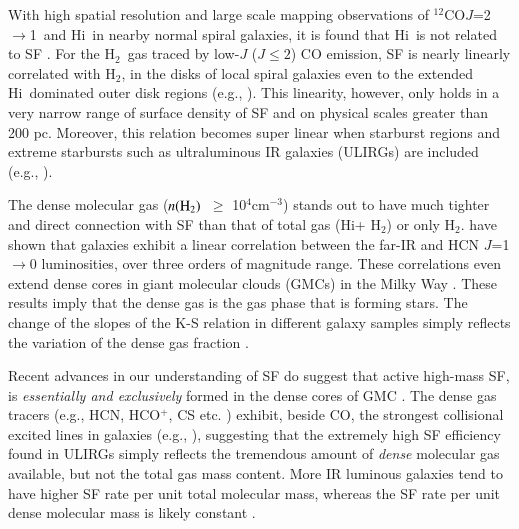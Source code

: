 \documentclass[legal,11pt]{article}
\def\cmt   {cm$^{-3}$\,}
\def\,{\thinspace}
\def\HI{H{\sc i}}
\def\Htwo{H$_2$}
\def\nHtwo{$n({\rm H}_2)$}
\def\Htwo       {H$_2$}
\def\COto      {$^{12}$CO$J$=2$\rightarrow$1}
\begin{document}
With high spatial resolution and large scale mapping observations of \COto\ and
\HI\ in nearby normal spiral galaxies, it is found that \HI\ is not related to
SF \citep[e.g.,][]{Bigiel2008}. For the \Htwo\ gas traced by low-$J$ ($J\le2$)
CO emission, SF is nearly linearly correlated with \Htwo, in the disks of local
spiral galaxies even to the extended \HI\ dominated outer disk
regions (e.g., \citealt{Bigiel2008,Schruba2011,Leroy2013}). This linearity,
however, only holds in a very narrow range of surface density of SF and on
physical scales greater than 200 pc.  Moreover, this relation becomes super
linear when starburst regions and extreme starbursts such as ultraluminous
IR galaxies (ULIRGs) are included (e.g.,
\citealt{Genzel2010,Daddi2010a}).  


The dense molecular gas (\nHtwo\ $\ge$ 10$^4$\cmt) stands out to have much
tighter and direct connection with SF than that of total gas (\HI + \Htwo) or
only \Htwo. \citet[][see Fig. \ref{fig:hcn10}]{gs04a,gs04b} have shown that galaxies exhibit a
linear correlation between the far-IR and HCN $J$=1$\rightarrow$0 luminosities,
over three orders of magnitude range. These correlations even extend dense
cores in giant molecular clouds (GMCs) in the Milky Way \citep{weg05,zgh2014}.
These results imply that the dense gas is the gas phase that is forming
stars. The change of the slopes of the K-S relation in different galaxy samples
simply reflects the variation of the dense gas fraction \citep[e.g.,][]{Lada2010b}. 

Recent advances in our understanding of SF do suggest that active high-mass SF,
is {\it essentially and exclusively} formed in the dense cores of GMC
\citep[e.g.,][]{Evans08}. The dense gas tracers (e.g., HCN, HCO$^+$, CS etc. )
exhibit, beside CO, the strongest collisional excited lines in galaxies (e.g.,
\citealt{rwc06,gc08,Baan08,Greve14}), suggesting that the extremely high SF
efficiency found in ULIRGs simply reflects the tremendous amount of {\it dense}
molecular gas available, but not the total gas mass
content\citep[e.g.,][]{Lada2010b}.  More IR luminous galaxies tend to have
higher SF rate per unit total molecular mass, whereas the SF rate per unit
dense molecular mass is likely constant \citep[][]{gs04a,gs04b}.
\end{document}

